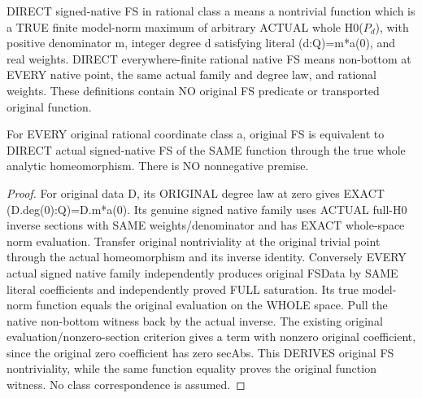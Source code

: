 \begin{definition}
\label{def:seven-direct-native-signed-fs-classes}
\leanok
DIRECT signed-native FS in rational class a means a nontrivial function
which is a TRUE finite model-norm maximum of arbitrary ACTUAL whole
H0($P_d$), with positive denominator m, integer degree d satisfying literal
(d:Q)=m*a(0), and real weights. DIRECT everywhere-finite rational native
FS means non-bottom at EVERY native point, the same actual family and
degree law, and rational weights. These definitions contain NO original
FS predicate or transported original function.
\end{definition}

\begin{theorem}
\label{thm:seven-native-original-signed-fs-class-comparison}
\leanok
For EVERY original rational coordinate class a, original FS is equivalent
to DIRECT actual signed-native FS of the SAME function through the true
whole analytic homeomorphism. There is NO nonnegative premise.
\end{theorem}
\begin{proof}
For original data D, its ORIGINAL degree law at zero gives EXACT
(D.deg(0):Q)=D.m*a(0). Its genuine signed native family uses ACTUAL
full-H0 inverse sections with SAME weights/denominator and has EXACT
whole-space norm evaluation. Transfer original nontriviality at the
original trivial point through the actual homeomorphism and its inverse
identity. Conversely EVERY actual signed native family independently
produces original FSData by SAME literal coefficients and independently
proved FULL saturation. Its true model-norm function equals the original
evaluation on the WHOLE space. Pull the native non-bottom witness back
by the actual inverse. The existing original evaluation/nonzero-section
criterion gives a term with nonzero original coefficient, since the
original zero coefficient has zero secAbs. This DERIVES original FS
nontriviality, while the same function equality proves the original
function witness. No class correspondence is assumed.
\end{proof}

